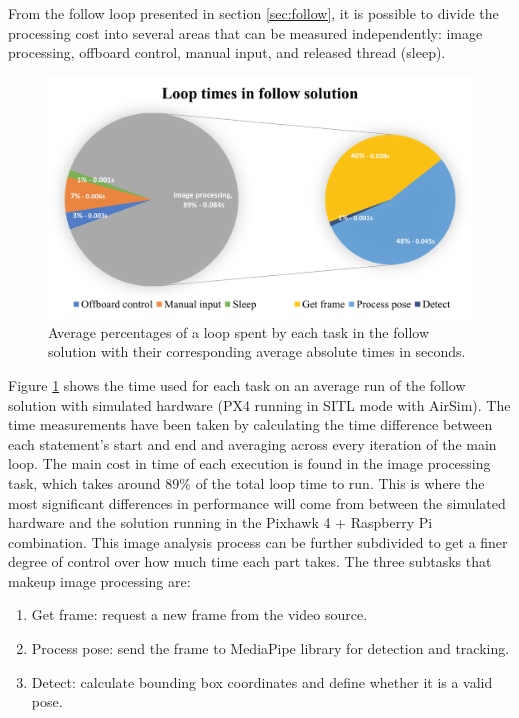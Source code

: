 From the follow loop presented in section \ref{sec:follow}, it is possible to divide the processing cost into several areas that can be measured independently: image processing, offboard control, manual input, and released thread (sleep).

\begin{figure}
  \centering
  \includegraphics[width=.9\textwidth, keepaspectratio]{img/sitl-performance.png}
  \caption{Average percentages of a loop spent by each task in the follow solution with their corresponding average absolute times in seconds.}
  \label{fig:perf-sitl-sim}
\end{figure}

Figure \ref{fig:perf-sitl-sim} shows the time used for each task on an average run of the follow solution with simulated hardware (PX4 running in SITL mode with AirSim).
The time measurements have been taken by calculating the time difference between each statement's start and end and averaging across every iteration of the main loop.
The main cost in time of each execution is found in the image processing task, which takes around 89\% of the total loop time to run.
This is where the most significant differences in performance will come from between the simulated hardware and the solution running in the Pixhawk 4 + Raspberry Pi combination.
This image analysis process can be further subdivided to get a finer degree of control over how much time each part takes.
The three subtasks that makeup image processing are:
\begin{enumerate}
    \item Get frame: request a new frame from the video source.
    \item Process pose: send the frame to MediaPipe library for detection and tracking.
    \item Detect: calculate bounding box coordinates and define whether it is a valid pose.
\end{enumerate}

